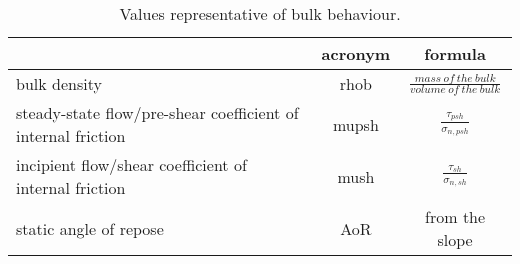 \begin{table}[h]
  \centering
    \begin{tabular}{lcc}
    \hline
     & acronym & formula \\ 
     \hline
    bulk density & \ac{rhob} & $\frac{mass ~ of ~ the ~ bulk}{volume ~ of ~ the ~ bulk}$ \\ 
    [5pt]
     
    steady-state flow/pre-shear coefficient of internal friction & \ac{mupsh}
     & $\frac{\tau_{psh}}{\sigma_{n,psh}}$ \\      [5pt]
     
    incipient flow/shear coefficient of internal friction & \ac{mush} &
    $\frac{\tau_{sh}}{\sigma_{n,sh}}$ \\      [5pt]
     
    static angle of repose & \ac{AoR}   & from the slope \\
\hline
    
    \end{tabular}%
  \caption{Values representative of bulk behaviour.}
\label{tab:14bulkvalues}
\end{table}%